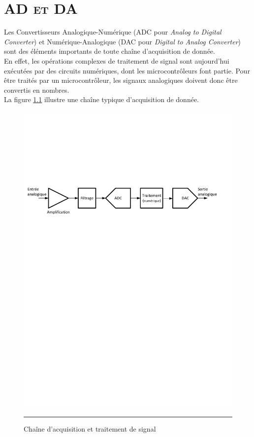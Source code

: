 \chapter{\textsc{AD et DA}}

Les Convertisseurs Analogique-Numérique (ADC pour \textit{Analog to Digital Converter}) et Numérique-Analogique (DAC pour \textit{Digital to Analog Converter}) sont des éléments importants de toute chaîne d'acquisition de donnée.\\
En effet, les opérations complexes de traitement de signal sont aujourd'hui exécutées par des circuits numériques, dont les microcontrôleurs font partie. Pour être traités par un microcontrôleur, les signaux analogiques doivent donc être convertis en nombres.\\
La figure \ref{fig:Acq_Chain} illustre une chaîne typique d'acquisition de donnée.

\begin{figure}[htb]
  \centering
  \includegraphics [angle=0, width=14cm]{./Figures/Chap11_ADC/Acq_Chain.pdf}
  \rule{35em}{0.5pt}
  \caption{Chaîne d'acquisition et traitement de signal}
  \label{fig:Acq_Chain}
\end{figure}

